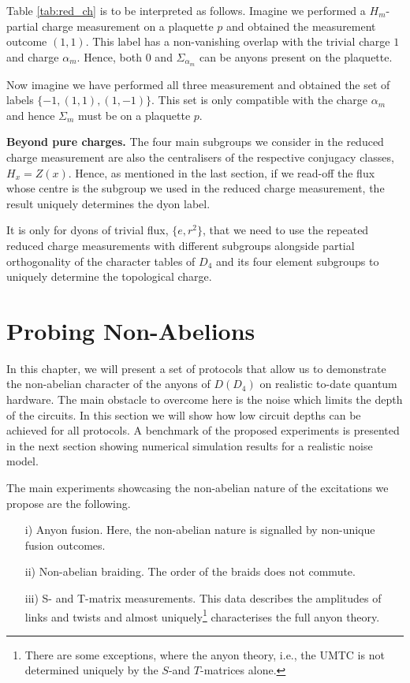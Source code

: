 \documentclass[two column]{article}
\begin{document}
Table \ref{tab:red_ch} is to be interpreted as follows. Imagine we performed a $H_m$-partial charge measurement on a plaquette $p$ and obtained the measurement outcome $(1,1)$. This label has a non-vanishing overlap with the trivial charge $1$ and charge $\alpha_m$. Hence, both $0$ and $\Sigma_{\alpha_m}$ can be anyons present on the plaquette.

Now imagine we have performed all three measurement and obtained the set of labels $\{-1, (1, 1), (1, -1)\}$. This set is only compatible with the charge $\alpha_m$ and hence $\Sigma_m$ must be on a plaquette $p$.

\textbf{Beyond pure charges.} The four main subgroups we consider in the reduced charge measurement are also the centralisers of the respective conjugacy classes, $H_x = Z(x)$. Hence, as mentioned in the last section, if we read-off the flux whose centre is the subgroup we used in the reduced charge measurement, the result uniquely determines the dyon label.

It is only for dyons of trivial flux, $\{e, r^2\}$, that we need to use the repeated reduced charge measurements with different subgroups alongside partial orthogonality of the character tables of $D_4$ and its four element subgroups to uniquely determine the topological charge.

\section{Probing Non-Abelions} \label{sec:probing}

In this chapter, we will present a set of protocols that allow us to demonstrate the non-abelian character of the anyons of $D(D_4)$ on realistic to-date quantum hardware. The main obstacle to overcome here is the noise which limits the depth of the circuits. In this section we will show how low circuit depths can be achieved for all protocols. A benchmark of the proposed experiments is presented in the next section showing numerical simulation results for a realistic noise model.


The main experiments showcasing the non-abelian nature of the excitations we propose are the following.
\begin{itemize}

\item[i)] Anyon fusion. Here, the non-abelian nature is signalled by non-unique fusion outcomes.

\item[ii)] Non-abelian braiding. The order of the braids does not commute.

\item[iii)] S- and T-matrix measurements. This data describes the amplitudes of links and twists and almost uniquely\footnote{There are some exceptions, where the anyon theory, i.e., the UMTC is not determined uniquely by the $S$-and $T$-matrices alone\cite{notdetermined2021}.} characterises the full anyon theory.
\end{itemize}
\end{document}
